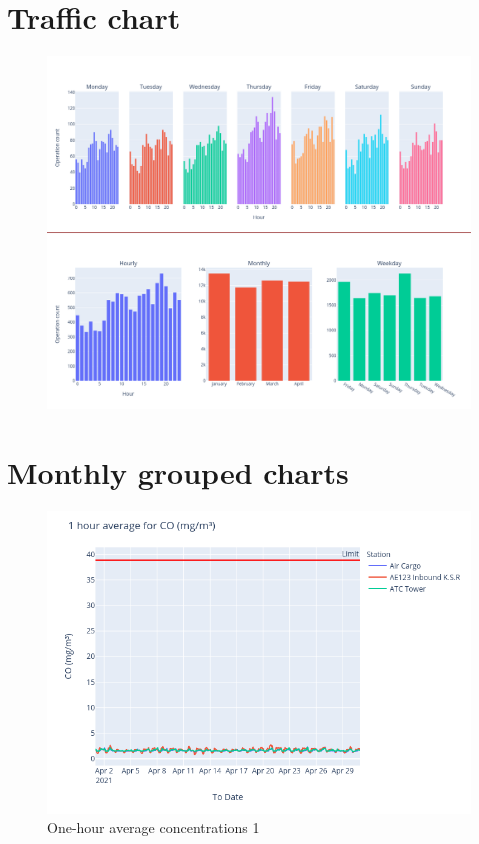 \documentclass[12pt, oneside]{book}
\begin{document}
{\chapter{Traffic chart}

{\begin{figure}[H]
\centering
\includegraphics[width=1\textwidth, keepaspectratio]{traffic}
\end{figure}}{}


\chapter{Monthly grouped charts}
{\begin{figure}[H]
\centering
\includegraphics[width=\textwidth]{image182}
\caption{One-hour average  concentrations 1}\label{image182}
\end{figure}}{}

}
\end{document}
